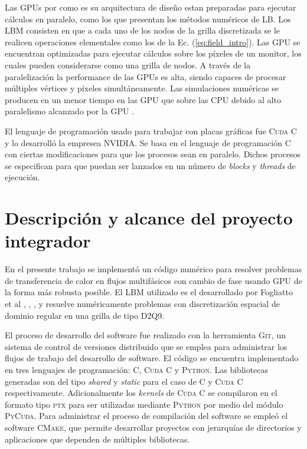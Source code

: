 Las GPUs por como es su arquitectura de diseño estan preparadas para ejecutar cálculos en paralelo, como los que presentan los métodos numéricos de LB. Los LBM consisten en que a cada uno de los nodos de la grilla discretizada se le realicen operaciones elementales como los de la Ec. (\ref{eq:field_intro}). Las GPU se encuentran optimizadas para ejecutar cálculos sobre los píxeles de un monitor, los cuales pueden considerarse como una grilla de nodos. A través de la paralelización la performance de las GPUs es alta, siendo capaces de procesar múltiples vértices y píxeles simultáneamente. Las simulaciones numéricas se producen en un menor tiempo en las GPU que sobre las CPU debido al alto paralelismo alcanzado por la GPU \cite{rinaldi2011modelos}.


El lenguaje de programación usado para trabajar con placas gráficas fue 
\textsc{Cuda C} y lo desarrolló la empresea NVIDIA. Se basa en el lenguaje de programación \textsc{C} con ciertas modificaciones para que los procesos sean en paralelo. Dichos procesos se especifican para que puedan ser lanzados en un número de \textit{blocks} y \textit{threads} de ejecución.

\newpage

\section{Descripción y alcance del proyecto integrador}

En el presente trabajo se implementó un código numérico para resolver problemas de transferencia de calor en flujos multifásicos con cambio de fase usando GPU de la forma más robusta posible. El LBM utilizado es el desarrollado por Fogliatto et al \cite{fogliatto2018modelado}, \cite{fogliatto2019simulation}, \cite{fogliatto2019transferencia}, y resuelve numéricamente problemas con discretización espacial de dominio regular en una grilla de tipo D2Q9.

El proceso de desarrollo del software fue realizado con la herramienta \textsc{Git}, un sistema de control de versiones distribuido que se emplea para administrar los flujos de trabajo del desarrollo de software.  El código se encuentra implementado en tres lenguajes de programación: \textsc{C}, \textsc{Cuda C} y \textsc{Python}. Las bibliotecas generadas son del tipo \textit{shared} y \textit{static} para el caso de \textsc{C} y \textsc{Cuda C} respectivamente. Adicionalmente los \textit{kernels} de \textsc{Cuda C} se compilaron en el formato tipo \textsc{ptx} para ser utilizadas mediante \textsc{Python} por medio del módulo \textsc{PyCuda}. Para administrar el proceso de compilación del software se empleó el software \textsc{CMake}, que permite desarrollar proyectos con jerarquías de directorios y aplicaciones que dependen de múltiples bibliotecas.

